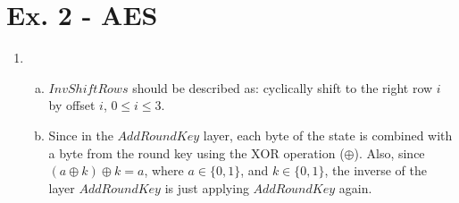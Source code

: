 \documentclass[11pt,a4paper]{article}
\begin{document}
\newpage
\section*{Ex. 2 - AES}
\begin{enumerate}
	\item
	\begin{enumerate}[(a)]
		\item $\mathit{InvShiftRows}$ should be described as: cyclically shift to the right row $i$ by offset $i$, $0 \leq i \leq 3$.
		
		\item Since in the $\mathit{AddRoundKey}$ layer, each byte of the state is combined with a byte from the round key using the $\mathrm{XOR}$ operation ($\oplus$). Also, since $(a\oplus k)\oplus k = a$, where $a\in \{0, 1\}$, and $k\in \{0, 1\}$, the inverse of the layer $\mathit{AddRoundKey}$ is just applying $\mathit{AddRoundKey}$ again.
		

\end{enumerate}
\end{enumerate}
\end{document}
